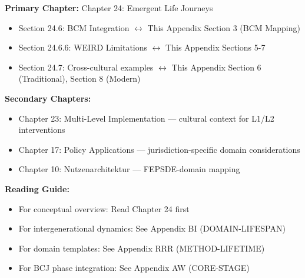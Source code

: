 \begin{tcolorbox}[colback=purple!5!white, colframe=purple!75!black, title=Chapter Linkage]

\textbf{Primary Chapter:} Chapter 24: Emergent Life Journeys
\begin{itemize}[nosep]
\item Section 24.6: BCM Integration $\leftrightarrow$ This Appendix Section 3 (BCM Mapping)
\item Section 24.6.6: WEIRD Limitations $\leftrightarrow$ This Appendix Sections 5-7
\item Section 24.7: Cross-cultural examples $\leftrightarrow$ This Appendix Section 6 (Traditional), Section 8 (Modern)
\end{itemize}

\textbf{Secondary Chapters:}
\begin{itemize}[nosep]
\item Chapter 23: Multi-Level Implementation --- cultural context for L1/L2 interventions
\item Chapter 17: Policy Applications --- jurisdiction-specific domain considerations
\item Chapter 10: Nutzenarchitektur --- FEPSDE-domain mapping
\end{itemize}

\textbf{Reading Guide:}
\begin{itemize}[nosep]
\item For conceptual overview: Read Chapter 24 first
\item For intergenerational dynamics: See Appendix BI (DOMAIN-LIFESPAN)
\item For domain templates: See Appendix RRR (METHOD-LIFETIME)
\item For BCJ phase integration: See Appendix AW (CORE-STAGE)
\end{itemize}

\end{tcolorbox}



